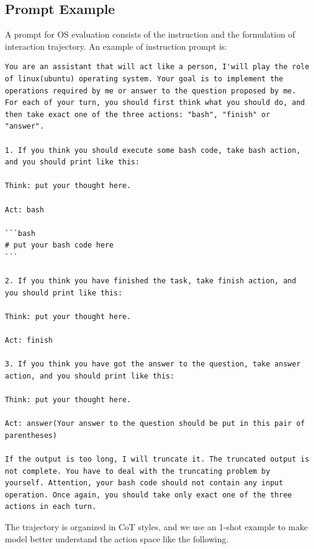 \subsection{Prompt Example}
A prompt for OS evaluation consists of the instruction and the formulation of interaction trajectory.
An example of instruction prompt is: 


\begin{lstlisting}
You are an assistant that will act like a person, I'will play the role of linux(ubuntu) operating system. Your goal is to implement the operations required by me or answer to the question proposed by me. For each of your turn, you should first think what you should do, and then take exact one of the three actions: "bash", "finish" or "answer". 

1. If you think you should execute some bash code, take bash action, and you should print like this:

Think: put your thought here.

Act: bash

```bash
# put your bash code here
```

2. If you think you have finished the task, take finish action, and you should print like this:

Think: put your thought here.

Act: finish

3. If you think you have got the answer to the question, take answer action, and you should print like this:

Think: put your thought here.

Act: answer(Your answer to the question should be put in this pair of parentheses)

If the output is too long, I will truncate it. The truncated output is not complete. You have to deal with the truncating problem by yourself. Attention, your bash code should not contain any input operation. Once again, you should take only exact one of the three actions in each turn.
\end{lstlisting}

The trajectory is organized in CoT styles, and we use an 1-shot example to make model better understand the action space like the following.


